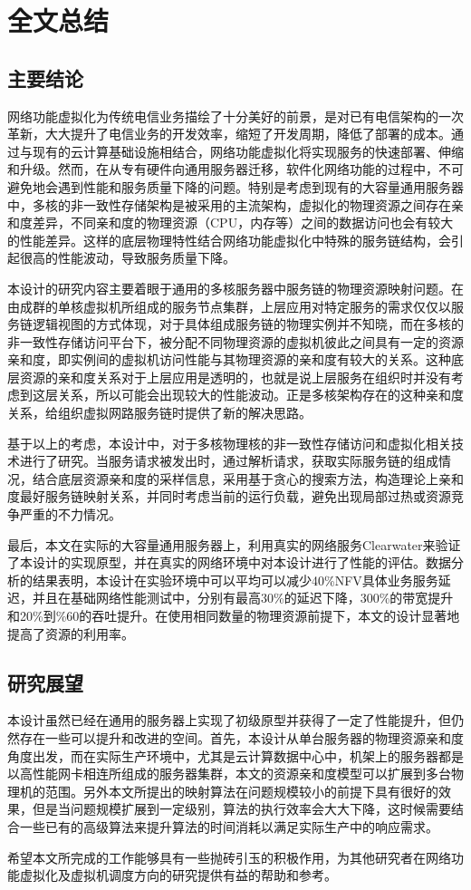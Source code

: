 \chapter{全文总结}
\label{chapter:conclusion}

\section{主要结论}
网络功能虚拟化为传统电信业务描绘了十分美好的前景，是对已有电信架构的一次革新，大大提升了电信业务的开发效率，缩短了开发周期，降低了部署的成本。通过与现有的云计算基础设施相结合，网络功能虚拟化将实现服务的快速部署、伸缩和升级。然而，在从专有硬件向通用服务器迁移，软件化网络功能的过程中，不可避免地会遇到性能和服务质量下降的问题。特别是考虑到现有的大容量通用服务器中，多核的非一致性存储架构是被采用的主流架构，虚拟化的物理资源之间存在亲和度差异，不同亲和度的物理资源（CPU，内存等）之间的数据访问也会有较大的性能差异。这样的底层物理特性结合网络功能虚拟化中特殊的服务链结构，会引起很高的性能波动，导致服务质量下降。

本设计的研究内容主要着眼于通用的多核服务器中服务链的物理资源映射问题。在由成群的单核虚拟机所组成的服务节点集群，上层应用对特定服务的需求仅仅以服务链逻辑视图的方式体现，对于具体组成服务链的物理实例并不知晓，而在多核的非一致性存储访问平台下，被分配不同物理资源的虚拟机彼此之间具有一定的资源亲和度，即实例间的虚拟机访问性能与其物理资源的亲和度有较大的关系。这种底层资源的亲和度关系对于上层应用是透明的，也就是说上层服务在组织时并没有考虑到这层关系，所以可能会出现较大的性能波动。正是多核架构存在的这种亲和度关系，给组织虚拟网路服务链时提供了新的解决思路。

基于以上的考虑，本设计中，对于多核物理核的非一致性存储访问和虚拟化相关技术进行了研究。当服务请求被发出时，通过解析请求，获取实际服务链的组成情况，结合底层资源亲和度的采样信息，采用基于贪心的搜索方法，构造理论上亲和度最好服务链映射关系，并同时考虑当前的运行负载，避免出现局部过热或资源竞争严重的不力情况。

最后，本文在实际的大容量通用服务器上，利用真实的网络服务Clearwater来验证了本设计的实现原型，并在真实的网络环境中对本设计进行了性能的评估。数据分析的结果表明，本设计在实验环境中可以平均可以减少40\%NFV具体业务服务延迟，并且在基础网络性能测试中，分别有最高30\%的延迟下降，300\%的带宽提升和20\%到\%60的吞吐提升。在使用相同数量的物理资源前提下，本文的设计显著地提高了资源的利用率。

\section{研究展望}
本设计虽然已经在通用的服务器上实现了初级原型并获得了一定了性能提升，但仍然存在一些可以提升和改进的空间。首先，本设计从单台服务器的物理资源亲和度角度出发，而在实际生产环境中，尤其是云计算数据中心中，机架上的服务器都是以高性能网卡相连所组成的服务器集群，本文的资源亲和度模型可以扩展到多台物理机的范围。另外本文所提出的映射算法在问题规模较小的前提下具有很好的效果，但是当问题规模扩展到一定级别，算法的执行效率会大大下降，这时候需要结合一些已有的高级算法来提升算法的时间消耗以满足实际生产中的响应需求。

希望本文所完成的工作能够具有一些抛砖引玉的积极作用，为其他研究者在网络功能虚拟化及虚拟机调度方向的研究提供有益的帮助和参考。
